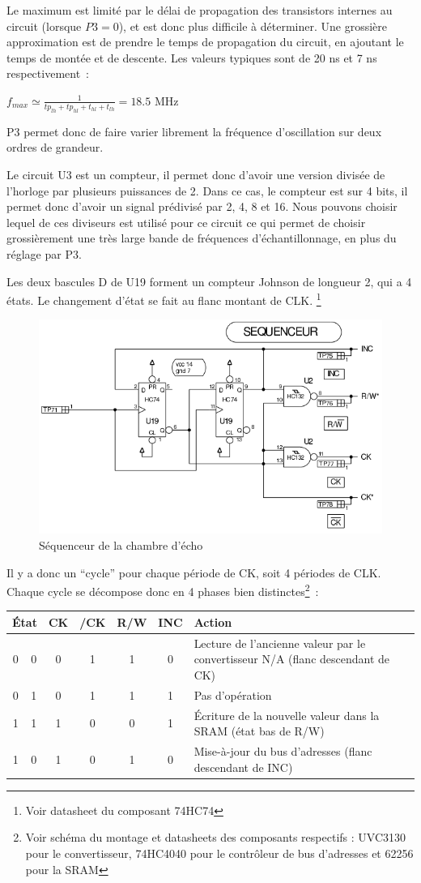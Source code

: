 \documentclass{article}
\begin{document}
Le maximum est limité par le délai de propagation des transistors internes au circuit (lorsque $P3 = 0$), et est donc plus difficile à déterminer. Une grossière approximation est de prendre le temps de propagation du circuit, en ajoutant le temps de montée et de descente. Les valeurs typiques sont de 20 ns et 7 ns respectivement~:
\begin{center}
$f_{max} \simeq \frac{1}{tp_{lh} + tp_{hl} + t_{hl} + t_{lh}} = 18.5 $ MHz
\end{center}

P3 permet donc de faire varier librement la fréquence d'oscillation sur deux ordres de grandeur.

Le circuit U3 est un compteur, il permet donc d'avoir une version divisée de l'horloge par plusieurs puissances de 2. Dans ce cas, le compteur est sur 4 bits, il permet donc d'avoir un signal prédivisé par 2, 4, 8 et 16.
Nous pouvons choisir lequel de ces diviseurs est utilisé pour ce circuit ce qui permet de choisir grossièrement une très large bande de fréquences d'échantillonnage, en plus du réglage par P3.

Les deux bascules D de U19 forment un compteur Johnson de longueur 2, qui a 4 états. Le changement d'état se fait au flanc montant de CLK. \footnote{Voir datasheet du composant 74HC74}\\

\begin{figure}[h]
	\centering
	\includegraphics[width = 0.5\linewidth]{shema_sequenceur_2.png}
	\caption{Séquenceur de la chambre d'écho}
	\label{fig:seq2}
\end{figure}



Il y a donc un ``cycle'' pour chaque période de CK, soit 4 périodes de CLK. Chaque cycle se décompose donc en 4 phases bien distinctes\footnote{Voir schéma du montage et datasheets des composants respectifs : UVC3130 pour le convertisseur, 74HC4040 pour le contrôleur de bus d'adresses et 62256 pour la SRAM}~:
\begin{center}
\begin{tabular}{|c|c|c|c|c|c|l|}
\hline
\multicolumn{2}{|c|}{État} & CK & /CK & R/W & INC & Action\\
\hline
0 & 0 & 0 & 1 & 1 & 0 & Lecture de l'ancienne valeur par le convertisseur N/A (flanc descendant de CK) \\
0 & 1 & 0 & 1 & 1 & 1 & Pas d'opération\\
1 & 1 & 1 & 0 & 0 & 1 & Écriture de la nouvelle valeur dans la SRAM (état bas de R/W)\\
1 & 0 & 1 & 0 & 1 & 0 & Mise-à-jour du bus d'adresses (flanc descendant de INC)\\
\hline
\end{tabular}
\end{center}
\end{document}

